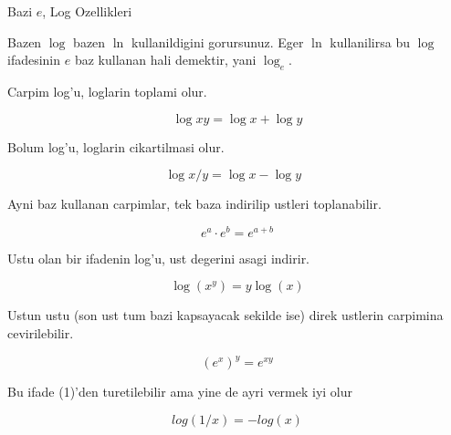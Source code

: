\documentclass[12pt,fleqn]{article}\usepackage{../common}
\begin{document}
Bazi $e$, Log Ozellikleri

Bazen $\log$ bazen $\ln$ kullanildigini gorursunuz. Eger $\ln$
kullanilirsa bu $\log$ ifadesinin $e$ baz kullanan hali demektir, yani
$\log_e$. 

Carpim log'u, loglarin toplami olur.

\[ \log xy = \log x + \log y \]

Bolum log'u, loglarin cikartilmasi olur.

\[ \log x/y = \log x - \log y  \ \ \ \label{1}\]

Ayni baz kullanan carpimlar, tek baza indirilip ustleri toplanabilir.

\[ e^a \cdot e^b = e^{a+b} \]

Ustu olan bir ifadenin log'u, ust degerini asagi indirir.

\[ \log(x^y) = y \log(x) \]

Ustun ustu (son ust tum bazi kapsayacak sekilde ise) direk ustlerin
carpimina cevirilebilir.

\[ (e^x)^y = e^{xy} \]

Bu ifade (1)'den turetilebilir ama yine de ayri vermek iyi olur

\[ log(1/x) = -log(x) \]
\end{document}
